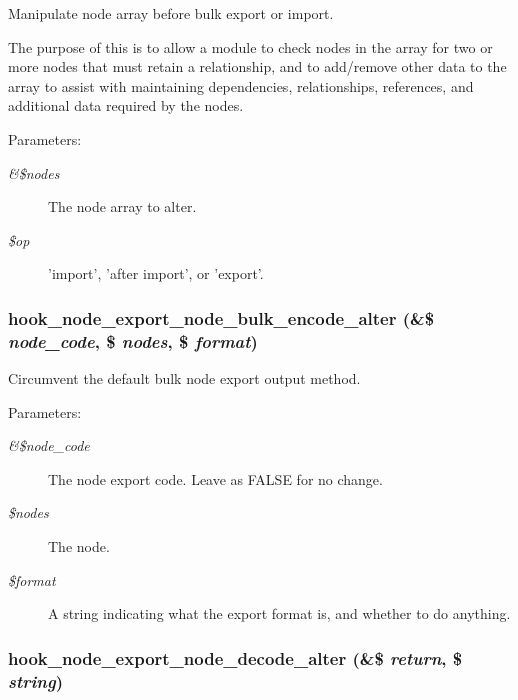 Manipulate node array before bulk export or import.

The purpose of this is to allow a module to check nodes in the array for two or more nodes that must retain a relationship, and to add/remove other data to the array to assist with maintaining dependencies, relationships, references, and additional data required by the nodes.

\begin{Desc}
\item[Parameters:]
\begin{description}
\item[{\em \&\$nodes}]The node array to alter. \item[{\em \$op}]'import', 'after import', or 'export'. \end{description}
\end{Desc}
\hypertarget{node__export_8api_8php_020d16d09246f3d732b7deea0fd7c0f4}{
\subsubsection[{hook\_\-node\_\-export\_\-node\_\-bulk\_\-encode\_\-alter}]{\setlength{\rightskip}{0pt plus 5cm}hook\_\-node\_\-export\_\-node\_\-bulk\_\-encode\_\-alter (\&\$ {\em node\_\-code}, \/  \$ {\em nodes}, \/  \$ {\em format})}}
\label{node__export_8api_8php_020d16d09246f3d732b7deea0fd7c0f4}


Circumvent the default bulk node export output method.

\begin{Desc}
\item[Parameters:]
\begin{description}
\item[{\em \&\$node\_\-code}]The node export code. Leave as FALSE for no change. \item[{\em \$nodes}]The node. \item[{\em \$format}]A string indicating what the export format is, and whether to do anything. \end{description}
\end{Desc}
\hypertarget{node__export_8api_8php_faa4d0af455b099ef3b5072a440b3107}{
\subsubsection[{hook\_\-node\_\-export\_\-node\_\-decode\_\-alter}]{\setlength{\rightskip}{0pt plus 5cm}hook\_\-node\_\-export\_\-node\_\-decode\_\-alter (\&\$ {\em return}, \/  \$ {\em string})}}
\label{node__export_8api_8php_faa4d0af455b099ef3b5072a440b3107}


